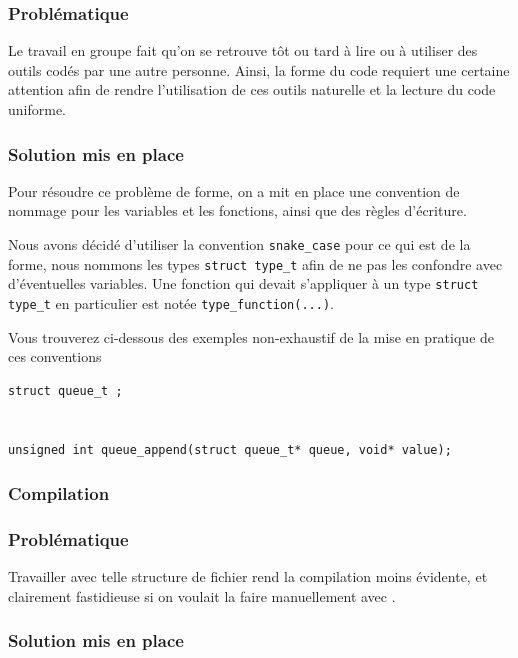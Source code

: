 \subsubsection*{Problématique}


    Le travail en groupe fait qu'on se retrouve tôt ou tard à lire ou à utiliser des outils codés par une 
autre personne. Ainsi, la forme du code requiert une certaine attention afin de rendre l'utilisation de ces
outils naturelle et la lecture du code uniforme.


\subsubsection*{Solution mis en place}

    Pour résoudre ce problème de forme, on a mit en place une convention de nommage pour les
variables et les fonctions, ainsi que des règles d'écriture. 

    Nous avons décidé d'utiliser la convention \lstinline{snake_case} pour ce qui est de la forme,
nous nommons les types \lstinline{struct type_t} afin de ne pas les confondre avec d'éventuelles variables.
Une fonction qui devait s'appliquer à un type \lstinline{struct type_t} en particulier est notée
\lstinline{type_function(...)}.

    Vous trouverez ci-dessous des exemples non-exhaustif de la mise en pratique de ces conventions

\begin{lstlisting}[frame=single, caption={Exemples de mise en pratique de ces conventions}]
struct queue_t ;


unsigned int queue_append(struct queue_t* queue, void* value);
\end{lstlisting}




\subsubsection*{Compilation}


\subsubsection*{Problématique}


    Travailler avec telle structure de fichier rend la compilation moins évidente, et clairement fastidieuse si on voulait 
la faire manuellement avec .


\subsubsection*{Solution mis en place}

